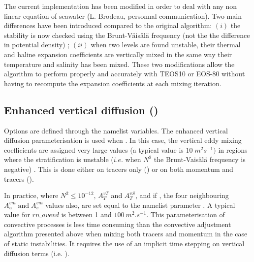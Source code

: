 \documentclass[../tex_main/NEMO_manual]{subfiles}
\begin{document}
The current implementation has been modified in order to deal with any non linear 
equation of seawater (L. Brodeau, personnal communication). 
Two main differences have been introduced compared to the original algorithm: 
$(i)$ the stability is now checked using the Brunt-V\"{a}is\"{a}l\"{a} frequency 
(not the the difference in potential density) ; 
$(ii)$ when two levels are found unstable, their thermal and haline expansion coefficients 
are vertically mixed in the same way their temperature and salinity has been mixed.
These two modifications allow the algorithm to perform properly and accurately 
with TEOS10 or EOS-80 without having to recompute the expansion coefficients at each 
mixing iteration.

\subsection{Enhanced vertical diffusion (\protect{})}
\label{subsec:ZDF_evd}



Options are defined through the   namelist variables.
The enhanced vertical diffusion parameterisation is used when . 
In this case, the vertical eddy mixing coefficients are assigned very large values 
(a typical value is $10\;m^2s^{-1})$ in regions where the stratification is unstable 
($i.e.$ when $N^2$ the Brunt-Vais\"{a}l\"{a} frequency is negative) 
\citep{Lazar_PhD97, Lazar_al_JPO99}. This is done either on tracers only 
() or on both momentum and tracers ().

In practice, where $N^2\leq 10^{-12}$, $A_T^{vT}$ and $A_T^{vS}$, and 
if , the four neighbouring $A_u^{vm} \;\mbox{and}\;A_v^{vm}$ 
values also, are set equal to the namelist parameter . A typical value 
for $rn\_avevd$ is between 1 and $100~m^2.s^{-1}$. This parameterisation of 
convective processes is less time consuming than the convective adjustment 
algorithm presented above when mixing both tracers and momentum in the 
case of static instabilities. It requires the use of an implicit time stepping on 
vertical diffusion terms (i.e. ). 
\end{document}
